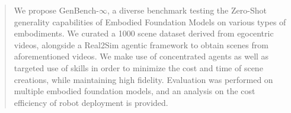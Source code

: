 \begin{abstract}
We propose GenBench-$\infty$, a diverse benchmark testing the Zero-Shot generality capabilities of Embodied Foundation Models on various types of embodiments. We curated a 1000 scene dataset derived from egocentric videos, alongside a Real2Sim agentic framework to obtain scenes from aforementioned videos. We make use of concentrated agents as well as targeted use of skills in order to minimize the cost and time of scene creations, while maintaining high fidelity. Evaluation was performed on multiple embodied foundation models, and an analysis on the cost efficiency of robot deployment is provided.


\end{abstract}